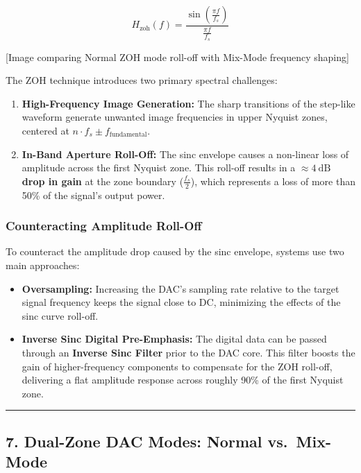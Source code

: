 \documentclass[
]{article}
\providecommand{\tightlist}{%
  \setlength{\itemsep}{0pt}\setlength{\parskip}{0pt}}
\begin{document}
\[H_{\text{zoh}}(f) = \frac{\sin\left(\frac{\pi f}{f_s}\right)}{\frac{\pi f}{f_s}}\]

{[}Image comparing Normal ZOH mode roll-off with Mix-Mode frequency
shaping{]}

The ZOH technique introduces two primary spectral challenges:

\begin{enumerate}
\def\labelenumi{\arabic{enumi}.}
\tightlist
\item
  \textbf{High-Frequency Image Generation:} The sharp transitions of the
  step-like waveform generate unwanted image frequencies in upper
  Nyquist zones, centered at \(n \cdot f_s \pm f_{\text{fundamental}}\).
\item
  \textbf{In-Band Aperture Roll-Off:} The sinc envelope causes a
  non-linear loss of amplitude across the first Nyquist zone. This
  roll-off results in a \textbf{\(\approx 4\ \text{dB}\) drop in gain}
  at the zone boundary (\(\frac{f_s}{2}\)), which represents a loss of
  more than 50\% of the signal's output power.
\end{enumerate}

\subsubsection{Counteracting Amplitude
Roll-Off}\label{counteracting-amplitude-roll-off}

To counteract the amplitude drop caused by the sinc envelope, systems
use two main approaches:

\begin{itemize}
\tightlist
\item
  \textbf{Oversampling:} Increasing the DAC's sampling rate relative to
  the target signal frequency keeps the signal close to DC, minimizing
  the effects of the sinc curve roll-off.
\item
  \textbf{Inverse Sinc Digital Pre-Emphasis:} The digital data can be
  passed through an \textbf{Inverse Sinc Filter} prior to the DAC core.
  This filter boosts the gain of higher-frequency components to
  compensate for the ZOH roll-off, delivering a flat amplitude response
  across roughly 90\% of the first Nyquist zone.
\end{itemize}

\begin{center}\rule{0.5\linewidth}{0.5pt}\end{center}

\subsection{7. Dual-Zone DAC Modes: Normal
vs.~Mix-Mode}\label{dual-zone-dac-modes-normal-vs.-mix-mode}
\end{document}
